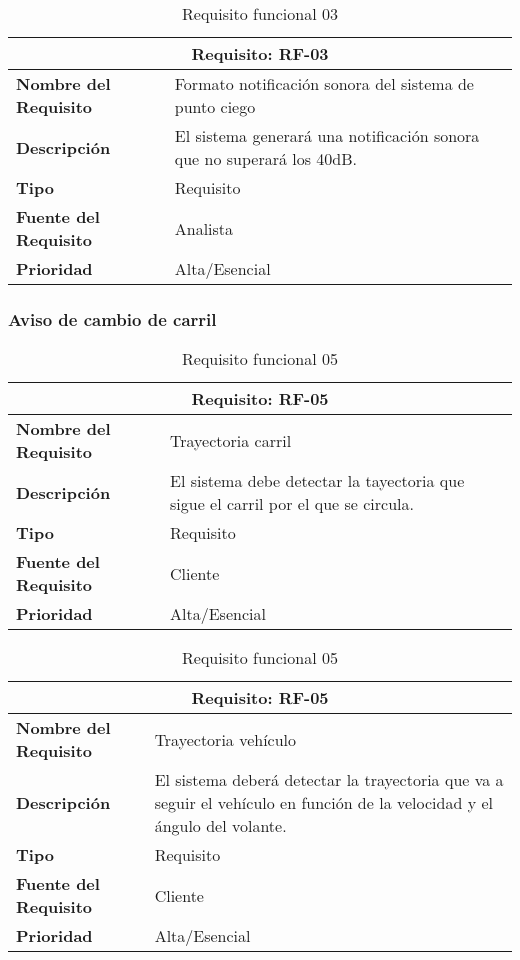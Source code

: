 \documentclass[10pt,a4paper,oldfontcommands]{dpds}
\begin{document}
\begin{table}[H]
\begin{center}
\begin{tabular}{p{} p{7cm}}
\multicolumn{2}{c}{\textbf{Requisito: RF-03} } \\
\hline \hline
\textbf{Nombre del Requisito} & Formato notificación sonora del sistema de punto ciego\\
\textbf{Descripción} & El sistema generará una notificación sonora que no superará los 40dB.\\
\textbf{Tipo} & Requisito  \\
\textbf{Fuente del Requisito} & Analista  \\
\textbf{Prioridad} & Alta/Esencial  \\ \hline
\end{tabular}
\caption{Requisito funcional 03}
\label{tab:personal}
\end{center}
\end{table}


\subsubsection{Aviso de cambio de carril}

\begin{table}[H]
\begin{center}
\begin{tabular}{p{} p{7cm}}
\multicolumn{2}{c}{\textbf{Requisito: RF-05} } \\
\hline \hline
\textbf{Nombre del Requisito} & Trayectoria carril\\
\textbf{Descripción} & El sistema debe detectar la tayectoria que sigue el carril por el que se circula. \\
\textbf{Tipo} & Requisito  \\
\textbf{Fuente del Requisito} & Cliente  \\
\textbf{Prioridad} & Alta/Esencial  \\ \hline
\end{tabular}
\caption{Requisito funcional 05}
\label{tab:personal}
\end{center}
\end{table}

\begin{table}[H]
\begin{center}
\begin{tabular}{p{} p{7cm}}
\multicolumn{2}{c}{\textbf{Requisito: RF-05} } \\
\hline \hline
\textbf{Nombre del Requisito} & Trayectoria vehículo\\
\textbf{Descripción} & El sistema deberá detectar la trayectoria que va a seguir el vehículo en función de la velocidad y el ángulo del volante. \\
\textbf{Tipo} & Requisito  \\
\textbf{Fuente del Requisito} & Cliente  \\
\textbf{Prioridad} & Alta/Esencial  \\ \hline
\end{tabular}
\caption{Requisito funcional 05}
\label{tab:personal}
\end{center}
\end{table}
\end{document}
